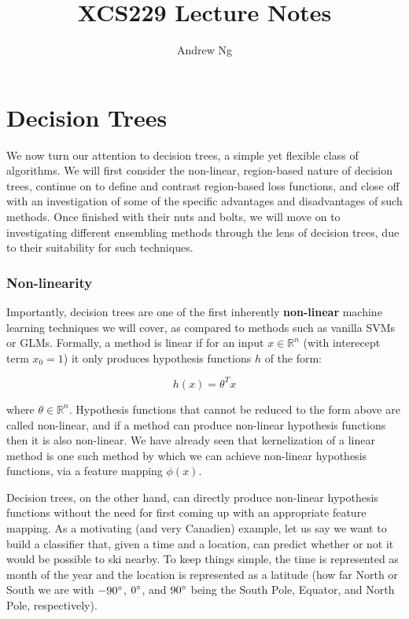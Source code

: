 \documentclass{article}
\begin{document}
\title{XCS229 Lecture Notes}
\author{Andrew Ng}
\date{}
\maketitle


\part*{Decision Trees}

We now turn our attention to decision trees, a simple yet flexible class of algorithms.  We will first consider the non-linear, region-based nature of decision trees, continue on to define and contrast region-based loss functions, and close off with an investigation of some of the specific advantages and disadvantages of such methods.  Once finished with their nuts and bolts, we will move on to investigating different ensembling methods through the lens of decision trees, due to their suitability for such techniques.  

\section{Non-linearity}

Importantly, decision trees are one of the first inherently {\bf non-linear} machine learning techniques we will cover, as compared to methods such as vanilla SVMs or GLMs.  Formally, a method is linear if for an input $x \in \mathbb{R}^n$ (with interecept term $x_0 = 1$) it only produces hypothesis functions $h$ of the form:

$$h(x) = \theta^T x$$

where $\theta \in \mathbb{R}^n$.  Hypothesis functions that cannot be reduced to the form above are called non-linear, and if a method can produce non-linear hypothesis functions then it is also non-linear.  We have already seen that kernelization of a linear method is one such method by which we can achieve non-linear hypothesis functions, via a feature mapping $\phi(x)$.

Decision trees, on the other hand, can directly produce non-linear hypothesis functions without the need for first coming up with an appropriate feature mapping.  As a motivating (and very Canadien) example, let us say we want to build a classifier that, given a time and a location, can predict whether or not it would be possible to ski nearby.  To keep things simple, the time is represented as month of the year and the location is represented as a latitude (how far North or South we are with $-90\degree$, $0\degree$, and $90\degree$ being the South Pole, Equator, and North Pole, respectively). 
\end{document}

